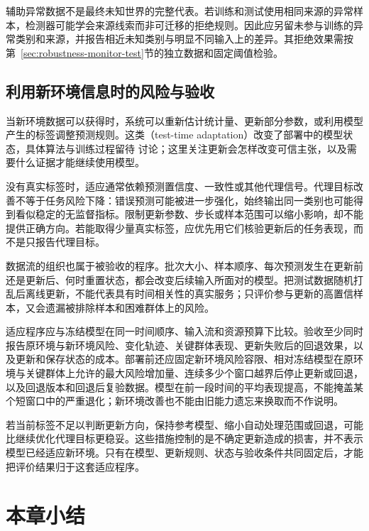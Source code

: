 辅助异常数据不是最终未知世界的完整代表。若训练和测试使用相同来源的异常样本，检测器可能学会来源线索而非可迁移的拒绝规则。因此应另留未参与训练的异常类别和来源，并报告相近未知类别与明显不同输入上的差异。其拒绝效果需按第~\ref{sec:robustness-monitor-test}节的独立数据和固定阈值检验。

\subsection{利用新环境信息时的风险与验收}
\label{sec:robustness-adaptation}

当新环境数据可以获得时，系统可以重新估计统计量、更新部分参数，或利用模型产生的标签调整预测规则。这类（test-time adaptation）改变了部署中的模型状态，具体算法与训练过程留待
讨论；这里关注更新会怎样改变可信主张，以及需要什么证据才能继续使用模型。

没有真实标签时，适应通常依赖预测置信度、一致性或其他代理信号。代理目标改善不等于任务风险下降：错误预测可能被进一步强化，始终输出同一类别也可能得到看似稳定的无监督指标。限制更新参数、步长或样本范围可以缩小影响，却不能提供正确方向。若能取得少量真实标签，应优先用它们核验更新后的任务表现，而不是只报告代理目标。

数据流的组织也属于被验收的程序。批次大小、样本顺序、每次预测发生在更新前还是更新后、何时重置状态，都会改变后续输入所面对的模型。把测试数据随机打乱后离线更新，不能代表具有时间相关性的真实服务；只评价参与更新的高置信样本，又会遗漏被排除样本和困难群体上的风险。

适应程序应与冻结模型在同一时间顺序、输入流和资源预算下比较。验收至少同时报告原环境与新环境风险、变化轨迹、关键群体表现、更新失败后的回退效果，以及更新和保存状态的成本。部署前还应固定新环境风险容限、相对冻结模型在原环境与关键群体上允许的最大风险增加量、连续多少个窗口越界后停止更新或回退，以及回退版本和回退后复验数据。模型在前一段时间的平均表现提高，不能掩盖某个短窗口中的严重退化；新环境改善也不能由旧能力遗忘来换取而不作说明。

若当前标签不足以判断更新方向，保持参考模型、缩小自动处理范围或回退，可能比继续优化代理目标更稳妥。这些措施控制的是不确定更新造成的损害，并不表示模型已经适应新环境。只有在模型、更新规则、状态与验收条件共同固定后，才能把评价结果归于这套适应程序。

\section{本章小结}
\label{sec:robustness-summary}

